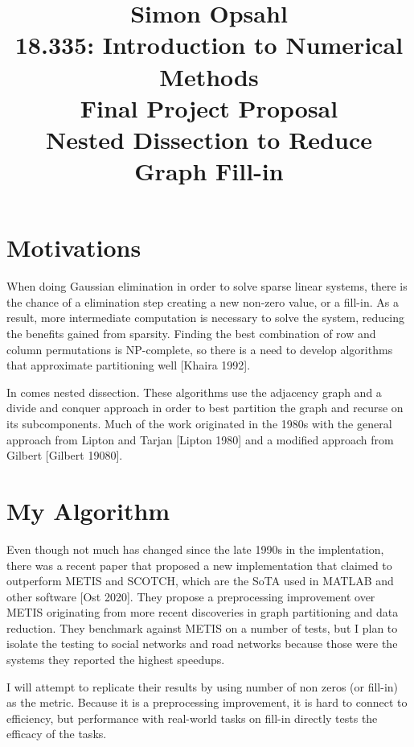 \documentclass{article}
\title{\textbf{Simon Opsahl}\\18.335: Introduction to Numerical Methods\\Final Project Proposal\\Nested Dissection to Reduce Graph Fill-in}
\begin{document}
\maketitle

\section*{Motivations}
When doing Gaussian elimination in order to solve sparse linear systems, there is the chance of a elimination step creating a new non-zero value, or a fill-in. As a result, more intermediate computation is necessary to solve the system, reducing the benefits gained from sparsity. Finding the best combination of row and column permutations is NP-complete, so there is a need to develop algorithms that approximate partitioning well [Khaira 1992]. 


In comes nested dissection. These algorithms use the adjacency graph and a divide and conquer approach in order to best partition the graph and recurse on its subcomponents. Much of the work originated in the 1980s with the general approach from Lipton and Tarjan [Lipton 1980] and a modified approach from Gilbert [Gilbert 19080].

\section*{My Algorithm}
Even though not much has changed since the late 1990s in the implentation, there was a recent paper that proposed a new implementation that claimed to outperform METIS and SCOTCH, which are the SoTA used in MATLAB and other software [Ost 2020]. They propose a preprocessing improvement over METIS originating from more recent discoveries in graph partitioning and data reduction. They benchmark against METIS on a number of tests, but I plan to isolate the testing to social networks and road networks because those were the systems they reported the highest speedups.

I will attempt to replicate their results by using number of non zeros (or fill-in) as the metric. Because it is a preprocessing improvement, it is hard to connect to efficiency, but performance with real-world tasks on fill-in directly tests the efficacy of the tasks. 
\end{document}
